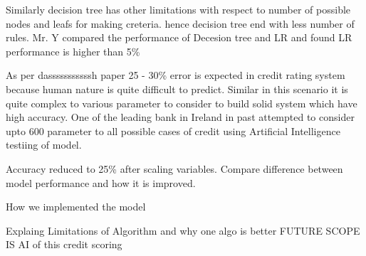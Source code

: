 Similarly decision tree has other limitations with respect to number of possible nodes and leafs for making creteria. hence decision tree end with less number of rules. Mr. Y compared the performance of Decesion tree and LR and found LR performance is higher than 5\%

As per dasssssssssssh paper 25 - 30\% error is expected in credit rating system because human nature is quite difficult to predict. Similar in this scenario it is quite complex to various parameter to consider to build solid system which have high accuracy. One of the leading bank in Ireland in past attempted to consider upto 600 parameter to all possible cases of credit using Artificial Intelligence 
testiing of model.

Accuracy reduced to 25\% after scaling variables. Compare difference between model performance and how it is improved.

How we implemented the model

Explaing Limitations of Algorithm and why one algo is better
FUTURE SCOPE IS AI of this credit scoring


